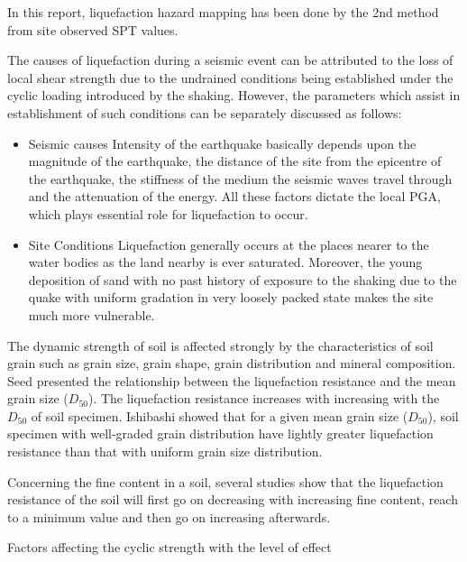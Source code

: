 In this report, liquefaction hazard mapping has been done by the 2nd method from site observed SPT values.

The causes of liquefaction during a seismic event can be attributed to the loss of local shear strength due to the undrained conditions being established under the cyclic loading introduced by the shaking. However, the parameters which assist in establishment of such conditions can be separately discussed as follows:

\begin{itemize}
\item Seismic causes
Intensity of the earthquake basically depends upon the magnitude of the earthquake, the distance of the site from the epicentre of the earthquake, the stiffness of the medium the seismic waves travel through and the attenuation of the energy. All these factors dictate the local PGA, which plays essential role for liquefaction to occur.
\item Site Conditions
Liquefaction generally occurs at the places nearer to the water bodies as the land nearby is ever saturated. Moreover, the young deposition of sand with no past history of exposure to the shaking due to the quake with uniform gradation in very loosely packed state makes the site much more vulnerable.
\end{itemize}

The dynamic strength of soil is affected strongly by the characteristics of soil grain such as grain size, grain shape, grain distribution and mineral composition. Seed \cite{r12} presented the relationship between the liquefaction resistance and the mean grain size ($D_{50}$). The liquefaction resistance increases with increasing with the $D_{50}$ of soil specimen. Ishibashi\cite{r14}  showed that for a given mean grain size ($D_{50}$), soil specimen with well-graded grain distribution have lightly greater liquefaction resistance than that with uniform grain size distribution.

Concerning the fine content in a soil, several studies show that the liquefaction resistance of the soil will first go on decreasing with increasing fine content, reach to a minimum value and then go on increasing afterwards. 

Factors affecting the cyclic strength with the level of effect \cite{r13}

